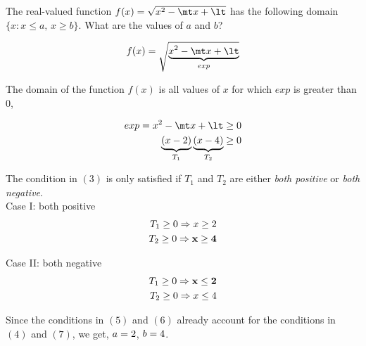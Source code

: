

\ADD\va\vb\mt
\MULTIPLY\va\vb\lt

\question The real-valued function $f(x) = \sqrt{x^2-\mt x+\lt}$ has
the following domain $\{x : x \leq a,\, x \geq b\}$. What are the 
values of $a$ and $b$?

\watchout

\begin{solution}

  \begin{align}
    f(x) = \sqrt{\underbrace{ x^2 -\mt x + \lt}_{exp}}
  \end{align}

  The domain of the function $f(x)$ is all values of $x$ for which
  $exp$ is greater than $0$,
  
  \begin{align}
    exp = x^2 -\mt x + \lt \geq 0 \\
    \underbrace{(x - \va)}_{T_1}\underbrace{(x - \vb)}_{T_2} \geq 0
  \end{align}
  
  The condition in $(3)$ is only satisfied if $T_1$ and $T_2$
  are either \textit{both positive} or \textit{both negative}.\\
  
  Case I: both positive
  \begin{align}
    T_1 \geq 0 \Rightarrow x \geq 2 \\
    T_2 \geq 0 \Rightarrow \mathbf{x \geq 4}    
  \end{align}
  
  Case II: both negative
  \begin{align}
    T_1 \geq 0 \Rightarrow \mathbf{x \leq 2} \\
    T_2 \geq 0 \Rightarrow x \leq 4 
  \end{align}

  Since the conditions in $(5)$ and $(6)$ already account
  for the conditions in $(4)$ and $(7)$, we get, $a=2$, $b=4$.  

\end{solution}

